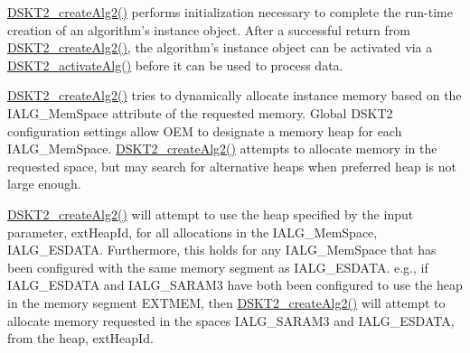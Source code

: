 \hyperlink{group___d_s_p_d_s_k_t2_gda6c7f86ed679447cb8f69b0c50a616c}{DSKT2\_\-create\-Alg2()} performs initialization necessary to complete the run-time creation of an algorithm's instance object. After a successful return from \hyperlink{group___d_s_p_d_s_k_t2_gda6c7f86ed679447cb8f69b0c50a616c}{DSKT2\_\-create\-Alg2()}, the algorithm's instance object can be activated via a \hyperlink{group___d_s_p_d_s_k_t2_gf946d426d6d9a95040d3967fa746cd7a}{DSKT2\_\-activate\-Alg()} before it can be used to process data.

\hyperlink{group___d_s_p_d_s_k_t2_gda6c7f86ed679447cb8f69b0c50a616c}{DSKT2\_\-create\-Alg2()} tries to dynamically allocate instance memory based on the IALG\_\-Mem\-Space attribute of the requested memory. Global DSKT2 configuration settings allow OEM to designate a memory heap for each IALG\_\-Mem\-Space. \hyperlink{group___d_s_p_d_s_k_t2_gda6c7f86ed679447cb8f69b0c50a616c}{DSKT2\_\-create\-Alg2()} attempts to allocate memory in the requested space, but may search for alternative heaps when preferred heap is not large enough.

\hyperlink{group___d_s_p_d_s_k_t2_gda6c7f86ed679447cb8f69b0c50a616c}{DSKT2\_\-create\-Alg2()} will attempt to use the heap specified by the input parameter, ext\-Heap\-Id, for all allocations in the IALG\_\-Mem\-Space, IALG\_\-ESDATA. Furthermore, this holds for any IALG\_\-Mem\-Space that has been configured with the same memory segment as IALG\_\-ESDATA. e.g., if IALG\_\-ESDATA and IALG\_\-SARAM3 have both been configured to use the heap in the memory segment EXTMEM, then \hyperlink{group___d_s_p_d_s_k_t2_gda6c7f86ed679447cb8f69b0c50a616c}{DSKT2\_\-create\-Alg2()} will attempt to allocate memory requested in the spaces IALG\_\-SARAM3 and IALG\_\-ESDATA, from the heap, ext\-Heap\-Id.

